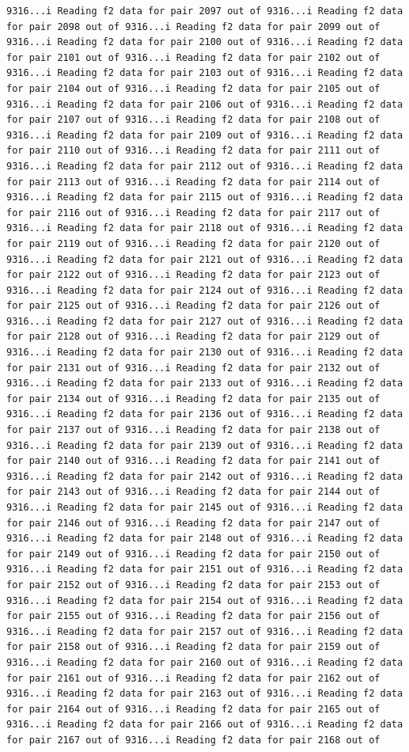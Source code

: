 \documentclass[
]{article}
\begin{document}
\begin{verbatim}
9316...i Reading f2 data for pair 2097 out of 9316...i Reading f2 data for pair 2098 out of 9316...i Reading f2 data for pair 2099 out of 9316...i Reading f2 data for pair 2100 out of 9316...i Reading f2 data for pair 2101 out of 9316...i Reading f2 data for pair 2102 out of 9316...i Reading f2 data for pair 2103 out of 9316...i Reading f2 data for pair 2104 out of 9316...i Reading f2 data for pair 2105 out of 9316...i Reading f2 data for pair 2106 out of 9316...i Reading f2 data for pair 2107 out of 9316...i Reading f2 data for pair 2108 out of 9316...i Reading f2 data for pair 2109 out of 9316...i Reading f2 data for pair 2110 out of 9316...i Reading f2 data for pair 2111 out of 9316...i Reading f2 data for pair 2112 out of 9316...i Reading f2 data for pair 2113 out of 9316...i Reading f2 data for pair 2114 out of 9316...i Reading f2 data for pair 2115 out of 9316...i Reading f2 data for pair 2116 out of 9316...i Reading f2 data for pair 2117 out of 9316...i Reading f2 data for pair 2118 out of 9316...i Reading f2 data for pair 2119 out of 9316...i Reading f2 data for pair 2120 out of 9316...i Reading f2 data for pair 2121 out of 9316...i Reading f2 data for pair 2122 out of 9316...i Reading f2 data for pair 2123 out of 9316...i Reading f2 data for pair 2124 out of 9316...i Reading f2 data for pair 2125 out of 9316...i Reading f2 data for pair 2126 out of 9316...i Reading f2 data for pair 2127 out of 9316...i Reading f2 data for pair 2128 out of 9316...i Reading f2 data for pair 2129 out of 9316...i Reading f2 data for pair 2130 out of 9316...i Reading f2 data for pair 2131 out of 9316...i Reading f2 data for pair 2132 out of 9316...i Reading f2 data for pair 2133 out of 9316...i Reading f2 data for pair 2134 out of 9316...i Reading f2 data for pair 2135 out of 9316...i Reading f2 data for pair 2136 out of 9316...i Reading f2 data for pair 2137 out of 9316...i Reading f2 data for pair 2138 out of 9316...i Reading f2 data for pair 2139 out of 9316...i Reading f2 data for pair 2140 out of 9316...i Reading f2 data for pair 2141 out of 9316...i Reading f2 data for pair 2142 out of 9316...i Reading f2 data for pair 2143 out of 9316...i Reading f2 data for pair 2144 out of 9316...i Reading f2 data for pair 2145 out of 9316...i Reading f2 data for pair 2146 out of 9316...i Reading f2 data for pair 2147 out of 9316...i Reading f2 data for pair 2148 out of 9316...i Reading f2 data for pair 2149 out of 9316...i Reading f2 data for pair 2150 out of 9316...i Reading f2 data for pair 2151 out of 9316...i Reading f2 data for pair 2152 out of 9316...i Reading f2 data for pair 2153 out of 9316...i Reading f2 data for pair 2154 out of 9316...i Reading f2 data for pair 2155 out of 9316...i Reading f2 data for pair 2156 out of 9316...i Reading f2 data for pair 2157 out of 9316...i Reading f2 data for pair 2158 out of 9316...i Reading f2 data for pair 2159 out of 9316...i Reading f2 data for pair 2160 out of 9316...i Reading f2 data for pair 2161 out of 9316...i Reading f2 data for pair 2162 out of 9316...i Reading f2 data for pair 2163 out of 9316...i Reading f2 data for pair 2164 out of 9316...i Reading f2 data for pair 2165 out of 9316...i Reading f2 data for pair 2166 out of 9316...i Reading f2 data for pair 2167 out of 9316...i Reading f2 data for pair 2168 out of 
\end{verbatim}
\end{document}
